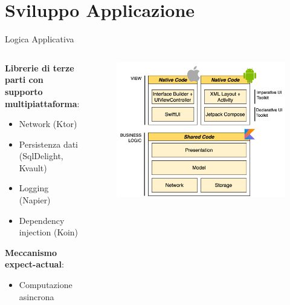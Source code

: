 
\section{Sviluppo Applicazione}

\begin{frame}{Logica Applicativa}
    \begin{columns}[onlytextwidth]
        \begin{column}{0.4\textwidth}
        
            \textbf{Librerie di terze parti con supporto multipiattaforma}:
            \begin{itemize}
                \item Network (Ktor)
                \item Persistenza dati (SqlDelight, Kvault)
                \item Logging (Napier)
                \item Dependency injection (Koin)
            \end{itemize}
            
            \vspace{5mm}
            
            \textbf{Meccanismo expect-actual}:
            \begin{itemize}
                \item Computazione asincrona
            \end{itemize}
            
        \end{column}
        \begin{column}{0.6\textwidth}
        
             \begin{figure}[H]
                \includegraphics[width=1\textwidth]{img/stack_kmm.png}
            \end{figure}
            
        \end{column}
    \end{columns}
\end{frame}

